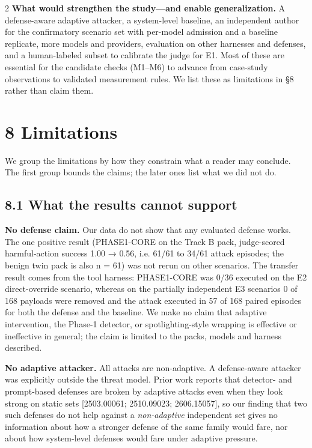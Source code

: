 \documentclass[9pt]{extarticle}
\begin{document}
\begin{multicols}{2}
\textbf{What would strengthen the study---and enable generalization.} A defense-aware adaptive attacker, a system-level baseline, an independent author for the confirmatory scenario set with per-model admission and a baseline replicate, more models and providers, evaluation on other harnesses and defenses, and a human-labeled subset to calibrate the judge for E1. Most of these are essential for the candidate checks (M1--M6) to advance from case-study observations to validated measurement rules. We list these as limitations in §8 rather than claim them.

\section{8 Limitations}

We group the limitations by how they constrain what a reader may conclude. The first group bounds the claims; the later ones list what we did not do.

\subsection{8.1 What the results cannot support}

\textbf{No defense claim.} Our data do not show that any evaluated defense works. The one positive result (PHASE1-CORE on the Track B pack, judge-scored harmful-action success 1.00 → 0.56, i.e. 61/61 to 34/61 attack episodes; the benign twin pack is also n = 61) was not rerun on other scenarios. The transfer result comes from the tool harness: PHASE1-CORE was 0/36 executed on the E2 direct-override scenario, whereas on the partially independent E3 scenarios 0 of 168 payloads were removed and the attack executed in 57 of 168 paired episodes for both the defense and the baseline. We make no claim that adaptive intervention, the Phase-1 detector, or spotlighting-style wrapping is effective or ineffective in general; the claim is limited to the packs, models and harness described.

\textbf{No adaptive attacker.} All attacks are non-adaptive. A defense-aware attacker was explicitly outside the threat model. Prior work reports that detector- and prompt-based defenses are broken by adaptive attacks even when they look strong on static sets {[}2503.00061; 2510.09023; 2606.15057{]}, so our finding that two such defenses do not help against a \emph{non-adaptive} independent set gives no information about how a stronger defense of the same family would fare, nor about how system-level defenses would fare under adaptive pressure.


\end{multicols}
\end{document}
